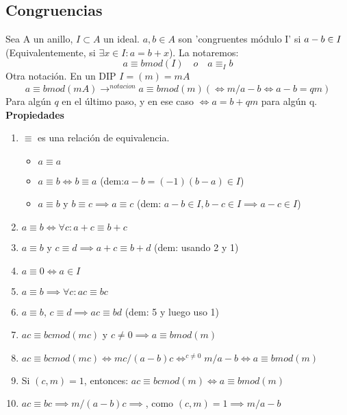\documentclass[11pt, a4paper, titlepage]{article}
\makeatletter
\renewenvironment{proof}[1][\proofname] {\vspace{-15pt}\par\pushQED{\qed}\normalfont\topsep6\p@\@plus6\p@\relax\trivlist\item[\hskip\labelsep\it#1\@addpunct{.}]\ignorespaces}{\popQED\endtrivlist\@endpefalse}
\theoremstyle{theorem-style}
\theoremstyle{definition-style}
\theoremstyle{remark-style}
\theoremstyle{example-style}
\newenvironment{nlist}
{\begin{enumerate}
\renewcommand\labelenumi{(\emph{\roman{enumi})}}}
{\end{enumerate}}
\makeatother
\begin{document}
\subsection{ Congruencias}
Sea A un anillo, $I \subset A$ un ideal. $a,b \in A$ son 'congruentes módulo I' si $a-b \in I\\$(Equivalentemente, si $\exists x \in I : a = b+x$). La notaremos:
\[
a \equiv b mod(I) \quad o \quad a \equiv_ I b
\]
Otra notación. En un DIP $I = (m) = mA$
\[
a \equiv bmod(mA) \to^{notacion} a \equiv b mod(m) ( \iff m/a-b \iff a-b = qm)
\]
Para algún $q$ en el último paso, y en ese caso $\iff a = b+qm$ para algún q.\\

\textbf{Propiedades}

\begin{nlist}
	\item $\equiv$ es una relación de equivalencia.\begin{itemize}
	\item $a \equiv a$
	\item $a \equiv b \iff b \equiv a$ (dem:$ a-b = (-1)(b-a) \in I$)
	\item $a \equiv b$ y $b \equiv c \implies a \equiv c$ (dem: $a-b\in I, b-c \in I \implies a-c \in I$)
\end{itemize}
	
	\item $a\equiv b \iff \forall c : a+ c \equiv b + c$
	\item $a\equiv b$ y $c \equiv d \implies a+c \equiv b + d$ (dem: usando 2 y 1)
	\item $a \equiv 0 \iff a \in I$
	\item $a \equiv b \implies \forall c : ac  \equiv bc$
	\item $a \equiv b$, $c \equiv d \implies ac \equiv bd$ (dem: 5 y luego uso 1)
	\item $ac \equiv bc mod(mc) $ y $c \ne 0 \implies a\equiv b mod(m)$\\

\begin{proof}
	$ac \equiv bc mod(mc) \iff mc/(a-b)c \iff^{c\ne 0} m/a-b \iff a\equiv b mod(m)$
\end{proof}
	\item Si $(c,m) = 1$, entonces: $ac\equiv bcmod(m) \iff a \equiv bmod(m)$\\
	\begin{proof}
	$ac\equiv bc \implies m/(a-b)c \implies$, como $(c,m) = 1 \implies m/a-b$
\end{proof}
	
	
\end{nlist}
\end{document}
